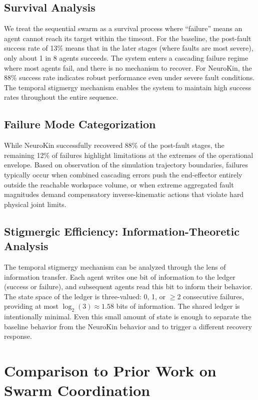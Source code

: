 \documentclass[12pt,a4paper,oneside]{report}
\begin{document}
\subsection{Survival Analysis}
\label{subsec:survival_analysis}

We treat the sequential swarm as a survival process where ``failure'' means an agent cannot reach its target within the timeout. For the baseline, the post-fault success rate of 13\% means that in the later stages (where faults are most severe), only about 1 in 8 agents succeeds. The system enters a cascading failure regime where most agents fail, and there is no mechanism to recover. For NeuroKin, the 88\% success rate indicates robust performance even under severe fault conditions. The temporal stigmergy mechanism enables the system to maintain high success rates throughout the entire sequence.
\subsection{Failure Mode Categorization}
\label{subsec:failure_mode_categorization}

While NeuroKin successfully recovered 88\% of the post-fault stages, the remaining 12\% of failures highlight limitations at the extremes of the operational envelope. Based on observation of the simulation trajectory boundaries, failures typically occur when combined cascading errors push the end-effector entirely outside the reachable workspace volume, or when extreme aggregated fault magnitudes demand compensatory inverse-kinematic actions that violate hard physical joint limits.
\subsection{Stigmergic Efficiency: Information-Theoretic Analysis}
\label{subsec:stigmergic_efficiency_information_theoretic_analysis}

The temporal stigmergy mechanism can be analyzed through the lens of information transfer. Each agent writes one bit of information to the ledger (success or failure), and subsequent agents read this bit to inform their behavior. The state space of the ledger is three-valued: 0, 1, or $\geq$2 consecutive failures, providing at most $\log_2(3) \approx 1.58$ bits of information. The shared ledger is intentionally minimal. Even this small amount of state is enough to separate the baseline behavior from the NeuroKin behavior and to trigger a different recovery response.
\section{Comparison to Prior Work on Swarm Coordination}
\end{document}
